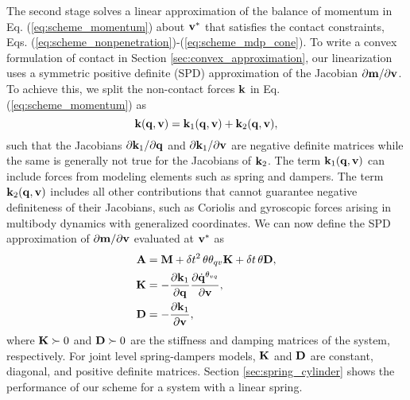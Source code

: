 The second stage solves a linear approximation of the balance of momentum in Eq.
(\ref{eq:scheme_momentum}) about ${\mathbf{v}}^*$ that satisfies the contact
constraints, Eqs. (\ref{eq:scheme_nonpenetration})-(\ref{eq:scheme_mdp_cone}). To write
a convex formulation of contact in Section \ref{sec:convex_approximation}, our
linearization uses a symmetric positive definite (SPD) approximation of
the Jacobian $\partial {\mathbf{m}}/\partial {\mathbf{v}}$. To achieve this, we split the
non-contact forces ${\mathbf{k}}$ in Eq. (\ref{eq:scheme_momentum}) as
\begin{equation*}
	{\mathbf{k}}({\mathbf{q}}, {\mathbf{v}}) = {\mathbf{k}}_1({\mathbf{q}}, {\mathbf{v}})+{\mathbf{k}}_2({\mathbf{q}}, {\mathbf{v}}),
\end{equation*}
such that the Jacobians $\partial {\mathbf{k}}_1/\partial{\mathbf{q}}$ and $\partial
{\mathbf{k}}_1/\partial{\mathbf{v}}$ are negative definite matrices while the same is
generally not true for the Jacobians of ${\mathbf{k}}_2$. The term ${\mathbf{k}}_1({\mathbf{q}},
{\mathbf{v}})$ can include forces from modeling elements such as spring and dampers.
The term ${\mathbf{k}}_2({\mathbf{q}}, {\mathbf{v}})$ includes all other contributions that cannot
guarantee negative definiteness of their Jacobians, such as Coriolis and
gyroscopic forces arising in multibody dynamics with generalized coordinates. We
can now define the SPD approximation of $\partial {\mathbf{m}}/\partial {\mathbf{v}}$
evaluated at ${\mathbf{v}}^*$ as
\begin{align}
	\mf{A}&=\mf{M}+\delta t^2\,\theta\theta_{qv}\mf{K}+\delta t\,\theta\mf{D},
	\label{eq:expression_for_A}\\
	\mf{K}&=-\frac{\partial \mf{k}_1}{\partial
	\mf{q}}\frac{\partial\dot{\mf{q}}^{\theta_{vq}}}{\partial\mf{v}},
	\label{eq:stiffness_matrix}\\
	\mf{D}&=-\frac{\partial \mf{k}_1}{\partial\mf{v}},
	\label{eq:dissipation_matrix}
\end{align}
where ${\mathbf{K}} \succ 0$ and ${\mathbf{D}}\succ 0$ are the stiffness and damping
matrices of the system, respectively. For joint level
spring-dampers models, ${\mathbf{K}}$ and ${\mathbf{D}}$ are constant, diagonal, and
positive definite matrices. Section \ref{sec:spring_cylinder} shows the
performance of our scheme for a system with a linear spring.

